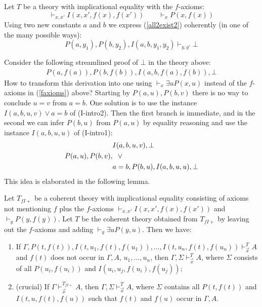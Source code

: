\documentclass[10pt,a4paper]{article}
\begin{document}
\begin{example}\label{exa:counter2CL}
Let $T$  be a theory with implicational equality with the $f$-axioms:
\begin{equation}\label{faxioms}
\vdash_{x,x'} I(x,x',f(x),f(x') )\quad\quad \vdash_{x} P(x,f(x))
\end{equation}
Using two new constants $a$ and $b$ we express (\ref{all2exist2}) coherently
(in one of the many possible ways):
\[
P(a,y_1),P(b,y_2),I(a,b,y_1,y_2)  \vdash_{y,y'} \bot
\]

Consider the following streamlined proof of $\bot$ in the theory above:
\begin{align*}
P(a,f(a)), P(b,f(b)),I(a,b,f(a),f(b)),\bot
\end{align*}
How to transform this derivation into one using 
$\vdash_{x} \exists u P(x,u)$ instead of the $f$-axioms 
in (\ref{faxioms}) above? Starting by $P(a,u), P(b,v)$
there is no way to conclude $u=v$ from $a=b$.
One solution is to use the instance $I(a,b,u,v) \lor a=b$ of (I-intro2).
Then the first branch is immediate, and in the second
we can infer $P(b,u)$ from $P(a,u)$ by equality reasoning and use 
the instance $I(a,b,u,u)$ of (I-intro1):
\begin{align*}
&I(a,b,u,v),\bot\\
P(a,u),P(b,v),&{\hphantom w}\lor\\
& a=b,P(b,u),I(a,b,u,u),\bot\\
\end{align*}
This idea is elaborated in the following lemma.
\end{example}




\begin{lemma}\label{lem:main}
Let $T_{f\!I\!{+}}$ be a coherent theory with implicational equality consisting of
axioms not mentioning $f$ plus the $f$-axioms $\vdash_{x,x'} I(x,x',f(x),f(x'))$
and $\vdash_{{y}} P({y},f({y}))$. Let $T$ be the coherent theory obtained from 
$T_{f\!I\!{+}}$ by leaving out the $f$-axioms and adding $\vdash_{{y}} \exists u P({y},u)$.
Then we have:
\begin{enumerate}
\item If $\Gamma,P(t,f(t)), I(t,u_1,f(t),f(u_1)),\ldots,I(t,u_n,f(t),f(u_n))\vdash_{\vec{x}}^{T} A$
and $f(t)$ does not occur in $\Gamma,A$, $u_1,\ldots,u_n$, then  
$\Gamma,\Sigma\vdash_{\vec{x}}^{T} A$, where $\Sigma$ consists of 
all $P(u_i,f(u_i))$ and $I(u_i,u_j,f(u_i),f(u_j))$;
\item (crucial) If $\Gamma\vdash_{\vec{x}}^{T_{f\!I\!{+}}} A$, 
then $\Gamma,\Sigma\vdash_{\vec{x}}^{T} A$,
where $\Sigma$ contains all $P(t,f(t))$ and
$I(t,u,f(t),f(u))$ such that $f(t)$ and $f(u)$ occur in $\Gamma,A$.
\end{enumerate}
\end{lemma}
\end{document}
